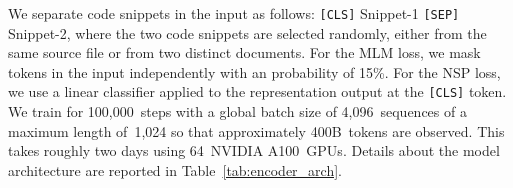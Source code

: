 \documentclass[10pt]{article} %
\begin{document}


We separate code snippets in the input as follows: \texttt{[CLS]} Snippet-1 \texttt{[SEP]} Snippet-2, where the two code snippets are selected randomly, either from the same source file or from two distinct documents. For the MLM loss, we mask tokens in the input independently with an probability of 15\%. For the NSP loss, we use a linear classifier applied to the representation output at the \texttt{[CLS]} token. 
We train for 100,000~steps with a global batch size of 4,096~sequences of a maximum length of~1,024 so that approximately 400B~tokens are observed. This takes roughly two days using 64~NVIDIA A100~GPUs. Details about the model architecture are reported in Table~\ref{tab:encoder_arch}. 

\end{document}
